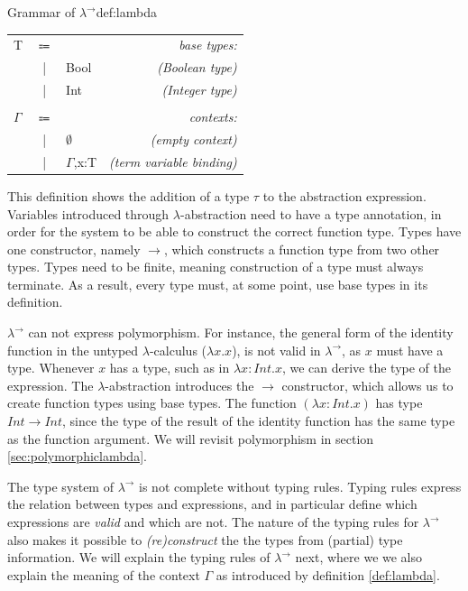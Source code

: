\begin{definitiontitled}{Grammar of $\lambda^{\rightarrow}$}{def:lambda}
\begin{changemargin}{-0.5cm}{0cm}
\begin{minipage}[b]{0.40\linewidth}
\begin{tabular}{lclr}
\\
T       & $\Coloneqq$ &                             & \textit{base types:} \\
        & |     & Bool                             & \textit{(Boolean type)} \\
        & |     & Int                              & \textit{(Integer type)} \\
\\
$\Gamma$& $\Coloneqq$ &                             & \textit{contexts:} \\
        & |     & $\emptyset$                      & \textit{(empty context)} \\
        & |     & $\Gamma$,x:T                     & \textit{(term variable binding)} \\
\end{tabular}
\end{minipage}
\end{changemargin}
\end{definitiontitled}

This definition shows the addition of a type $\tau$ to the abstraction expression.
Variables introduced through $\lambda$-abstraction need to have a type annotation, in order for the system to be able to construct the correct function type.
Types have one constructor, namely $\rightarrow$, which constructs a function type from two other types.
Types need to be finite, meaning construction of a type must always terminate.
As a result, every type must, at some point, use base types in its definition.

$\lambda^\rightarrow$ can not express polymorphism.
For instance, the general form of the identity function in the untyped $\lambda$-calculus ($\lambda x.x$), is not valid in $\lambda^\rightarrow$, as $x$ must have a type.
Whenever $x$ has a type, such as in $\lambda x:Int.x$, we can derive the type of the expression.
The $\lambda$-abstraction introduces the $\rightarrow$ constructor, which allows us to create function types using base types.
The function $(\lambda x:Int.x)$ has type $Int \rightarrow Int$, since the type of the result of the identity function has the same type as the function argument.
We will revisit polymorphism in section \ref{sec:polymorphiclambda}.

The type system of $\lambda^\rightarrow$ is not complete without typing rules.
Typing rules express the relation between types and expressions, and in particular define which expressions are \textit{valid} and which are not.
The nature of the typing rules for $\lambda^\rightarrow$ also makes it possible to \textit{(re)construct} the the types from (partial) type information.
We will explain the typing rules of $\lambda^\rightarrow$ next, where we we also explain the meaning of the context $\Gamma$ as introduced by definition \ref{def:lambda}.

